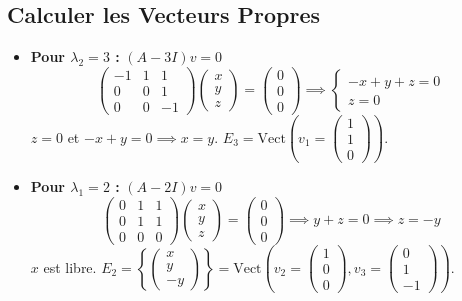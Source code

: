 \documentclass[french]{yLectureNote}
\begin{document}
\subsection{Calculer les Vecteurs Propres}
\begin{itemize}
    \item \textbf{Pour $\lambda_2 = 3$ :} $(A - 3I)v = 0$
    $$\begin{pmatrix} -1 & 1 & 1 \\ 0 & 0 & 1 \\ 0 & 0 & -1 \end{pmatrix} \begin{pmatrix} x \\ y \\ z \end{pmatrix} = \begin{pmatrix} 0 \\ 0 \\ 0 \end{pmatrix} \implies \begin{cases} -x + y + z = 0 \\ z = 0 \end{cases}$$
    $z=0$ et $-x+y=0 \implies x=y$.
    $E_3 = \text{Vect}\left( v_1 = \begin{pmatrix} 1 \\ 1 \\ 0 \end{pmatrix} \right)$.

    \item \textbf{Pour $\lambda_1 = 2$ :} $(A - 2I)v = 0$
    $$\begin{pmatrix} 0 & 1 & 1 \\ 0 & 1 & 1 \\ 0 & 0 & 0 \end{pmatrix} \begin{pmatrix} x \\ y \\ z \end{pmatrix} = \begin{pmatrix} 0 \\ 0 \\ 0 \end{pmatrix} \implies y + z = 0 \implies z = -y$$
    $x$ est libre. $E_2 = \left\{ \begin{pmatrix} x \\ y \\ -y \end{pmatrix} \right\} = \text{Vect}\left( v_2 = \begin{pmatrix} 1 \\ 0 \\ 0 \end{pmatrix}, v_3 = \begin{pmatrix} 0 \\ 1 \\ -1 \end{pmatrix} \right)$.
\end{itemize}
\end{document}
